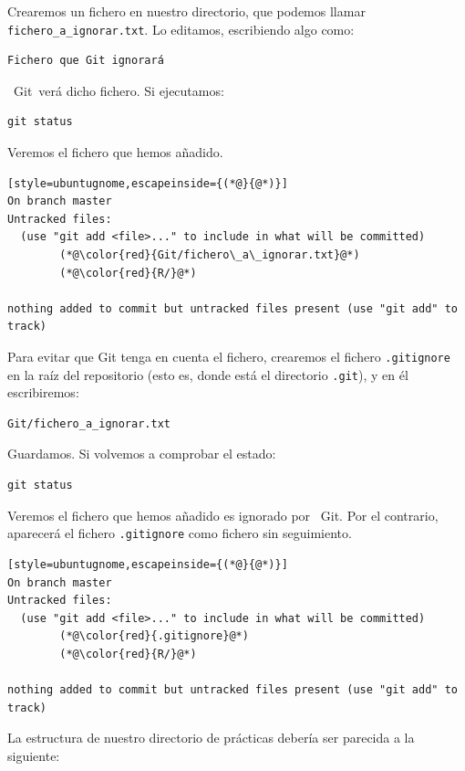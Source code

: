 \documentclass[11pt,a4paper]{article}
\newcommand{\Git}{\textcolor{git}{\faIcon{git-alt}}~\!Git}
\theoremstyle{exercise}
\begin{document}
Crearemos un fichero en nuestro directorio, que podemos llamar \texttt{fichero\_a\_ignorar.txt}. Lo editamos, escribiendo algo como:
\begin{lstlisting}[style=mdstyle]
Fichero que Git ignorará
\end{lstlisting}
\Git\ verá dicho fichero. Si ejecutamos:
\begin{lstlisting}[style=ubuntugnome]
git status
\end{lstlisting}
Veremos el fichero que hemos añadido.
\begin{lstlisting}[style=ubuntugnome,escapeinside={(*@}{@*)}]
On branch master
Untracked files:
  (use "git add <file>..." to include in what will be committed)
        (*@\color{red}{Git/fichero\_a\_ignorar.txt}@*)
        (*@\color{red}{R/}@*)

nothing added to commit but untracked files present (use "git add" to track)
\end{lstlisting}
Para evitar que Git tenga en cuenta el fichero, crearemos el fichero \texttt{.gitignore} en la raíz del repositorio (esto es, donde está el directorio \texttt{.git}), y en él escribiremos:
\begin{lstlisting}[style=mdstyle]
Git/fichero_a_ignorar.txt
\end{lstlisting}
Guardamos. Si volvemos a comprobar el estado:
\begin{lstlisting}[style=ubuntugnome]
git status
\end{lstlisting}
Veremos el fichero que hemos añadido es ignorado por \Git. 
Por el contrario, aparecerá el fichero \texttt{.gitignore} como fichero sin seguimiento.
\begin{lstlisting}[style=ubuntugnome,escapeinside={(*@}{@*)}]
On branch master
Untracked files:
  (use "git add <file>..." to include in what will be committed)
        (*@\color{red}{.gitignore}@*)
        (*@\color{red}{R/}@*)
        
nothing added to commit but untracked files present (use "git add" to track)
\end{lstlisting}

\noindent La estructura de nuestro directorio de prácticas debería ser parecida a la siguiente:

\begin{center}
\begin{minipage}{0.75\linewidth}
\end{minipage}
\end{center}
\end{document}
